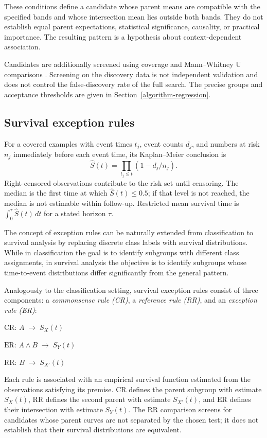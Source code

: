 These conditions define a candidate whose parent means are compatible with the specified bands and whose intersection mean lies outside both bands. They do not establish equal parent expectations, statistical significance, causality, or practical importance. The resulting pattern is a hypothesis about context-dependent association.

Candidates are additionally screened using coverage and Mann--Whitney U comparisons \cite{Mann1947}. Screening on the discovery data is not independent validation and does not control the false-discovery rate of the full search. The precise groups and acceptance thresholds are given in Section~\ref{algorithm-regression}.

\subsection{Survival exception rules}
\label{survival-exception-rules}
For a covered examples with event times $t_j$, event counts $d_j$, and
numbers at risk $n_j$ immediately before each event time, its Kaplan--Meier
conclusion is \cite{MachaSurvival2026}
\[
\widehat S(t)=\prod_{t_j\leq t}(1-d_j/n_j).
\]
Right-censored observations contribute to the risk set until censoring.
The median is the first time at which $\widehat S(t)\leq0.5$; if that level
is not reached, the median is not estimable within follow-up. Restricted
mean survival time is $\int_0^\tau\widehat S(t)\,dt$ for a stated horizon $\tau$.

The concept of exception rules can be naturally extended from classification to survival analysis by replacing discrete class labels with survival distributions. While in classification the goal is to identify subgroups with different class assignments, in survival analysis the objective is to identify subgroups whose time-to-event distributions differ significantly from the general pattern.

Analogously to the classification setting, survival exception rules consist of three components: a \emph{commonsense rule (CR)}, a \emph{reference rule (RR)}, and an \emph{exception rule (ER)}:

\begin{center}
\(\text{CR: } A \;\rightarrow\; S_X(t)\)

\(\text{ER: } A \land B \;\rightarrow\; S_Y(t)\)

\(\text{RR: } B \;\rightarrow\; S_{X'}(t)\)
\end{center}

Each rule is associated with an empirical survival function estimated from
the observations satisfying its premise. CR defines the parent subgroup
with estimate $S_X(t)$, RR defines the second parent with estimate $S_{X'}(t)$,
and ER defines their intersection with estimate $S_Y(t)$. The RR comparison
screens for candidates whose parent curves are not separated by the chosen
test; it does not establish that their survival distributions are equivalent.

